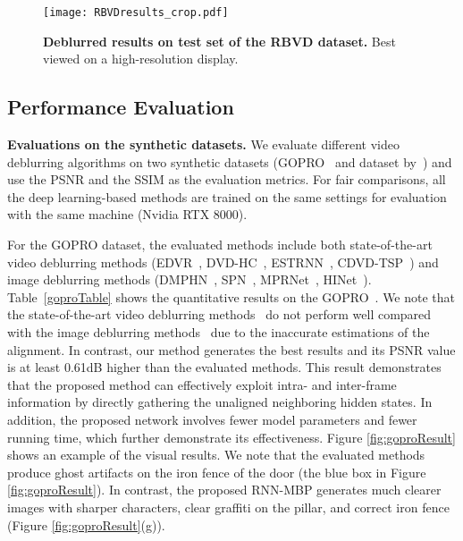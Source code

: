 \documentclass[letterpaper]{article} \usepackage{aaai22}  \usepackage{times}  \usepackage{helvet}  \usepackage{courier}  \usepackage[hyphens]{url}  \usepackage{graphicx} \urlstyle{rm} \def\UrlFont{\rm}  \usepackage{natbib}  \usepackage{caption} \DeclareCaptionStyle{ruled}{labelfont=normalfont,labelsep=colon,strut=off} \frenchspacing  \setlength{\pdfpagewidth}{8.5in}  \setlength{\pdfpageheight}{11in}  \newcommand{\hang}{\textcolor[rgb]{0.98,0.5,0.04}}
\begin{document}
\begin{figure*}[!t] 
  \centering
  \texttt{[image: RBVDresults\_crop.pdf]}
  \vspace{-3mm}
  \caption{\textbf{Deblurred results on test set of the RBVD dataset.} Best viewed on a high-resolution display.}
\label{fig:RBVDresults}
\vspace{-5mm}
\end{figure*}


\subsection{Performance Evaluation}
{\bf Evaluations on the synthetic datasets.} 
We evaluate different video deblurring algorithms on two synthetic datasets (GOPRO~\cite{deepdeblur} and dataset by~\cite{Su_2017_CVPR}) and use the PSNR and the SSIM as the evaluation metrics.
For fair comparisons, all the deep learning-based methods are trained on the same settings for evaluation with the same machine (Nvidia RTX 8000).

For the GOPRO dataset, the evaluated methods include both state-of-the-art video deblurring methods (EDVR~\cite{2019EDVR}, DVD-HC~\cite{Su_2017_CVPR}, ESTRNN~\cite{ESTRNN}, CDVD-TSP~\cite{Pan_2020_CVPR}) and image deblurring methods (DMPHN~\cite{8953205}, SPN~\cite{2020Spatially}, MPRNet~\cite{Zamir2021MPRNet}, HINet~\cite{Chen_2021_CVPR}).
Table~\ref{goproTable} shows the quantitative results on the GOPRO~\cite{deepdeblur}.
We note that the state-of-the-art video deblurring methods~\cite{2019EDVR, Pan_2020_CVPR} do not perform well compared with the image deblurring methods~\cite{Zamir2021MPRNet, Chen_2021_CVPR} due to the inaccurate estimations of the alignment. 
In contrast, our method generates the best results and its PSNR value is at least 0.61dB higher than the evaluated methods. 
This result demonstrates that the proposed method can effectively exploit intra- and inter-frame information by directly gathering the unaligned neighboring hidden states.
In addition, the proposed network involves fewer model parameters and fewer running time, which further demonstrate its effectiveness.
Figure \ref{fig:goproResult} shows an example of the visual results. We note that the evaluated methods produce ghost artifacts on the iron fence of the door (the blue box in Figure \ref{fig:goproResult}).
In contrast, the proposed RNN-MBP generates much clearer images with sharper characters, clear graffiti on the pillar, and correct iron fence (Figure \ref{fig:goproResult}(g)).
\end{document}
